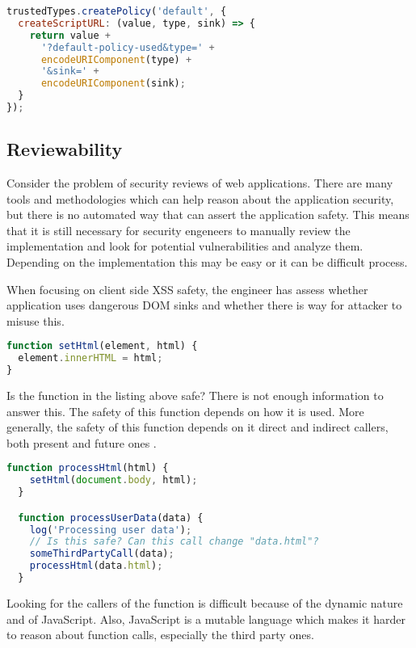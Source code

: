 \bigskip
\begin{lstlisting}[language=JavaScript, caption=Creating a default policy \cite{tt_spec:default_policy}]
trustedTypes.createPolicy('default', {
  createScriptURL: (value, type, sink) => {
    return value +
      '?default-policy-used&type=' +
      encodeURIComponent(type) +
      '&sink=' +
      encodeURIComponent(sink);
  }
});
\end{lstlisting}

\subsection{Reviewability}

Consider the problem of security reviews of web applications. There are many tools and methodologies
which can help reason about the application security, but there is no automated way that can assert
the application safety. This means that it is still necessary for security engeneers to manually
review the implementation and look for potential vulnerabilities and analyze them. Depending on the
implementation this may be easy or it can be difficult process.

When focusing on client side XSS safety, the engineer has assess whether application uses dangerous
DOM sinks and whether there is way for attacker to misuse this.

\bigskip
\begin{lstlisting}[language=JavaScript, caption=Possibly dangerous function]
function setHtml(element, html) {
  element.innerHTML = html;
}
\end{lstlisting}

Is the function in the listing above safe? There is not enough information to answer this. The
safety of this function depends on how it is used. More generally, the safety of this function
depends on it direct and indirect callers, both present and future ones \cite{tt_design_history}.

\bigskip
\begin{lstlisting}[language=JavaScript, caption=Usage of the possibly dangerous function, label={lst:dangerous_fn_usage}]
  function processHtml(html) {
    setHtml(document.body, html);
  }

  function processUserData(data) {
    log('Processing user data');
    // Is this safe? Can this call change "data.html"?
    someThirdPartyCall(data);
    processHtml(data.html);
  }
\end{lstlisting}

Looking for the callers of the function is difficult because of the dynamic nature and of
JavaScript. Also, JavaScript is a mutable language which makes it harder to reason about function
calls, especially the third party ones.

